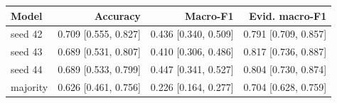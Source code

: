 \begin{tabular}{lrrr}
\toprule
Model & Accuracy & Macro-F1 & Evid. macro-F1 \\
\midrule
seed 42 & 0.709 [0.555, 0.827] & 0.436 [0.340, 0.509] & 0.791 [0.709, 0.857] \\
seed 43 & 0.689 [0.531, 0.807] & 0.410 [0.306, 0.486] & 0.817 [0.736, 0.887] \\
seed 44 & 0.689 [0.533, 0.799] & 0.447 [0.341, 0.527] & 0.804 [0.730, 0.874] \\
majority & 0.626 [0.461, 0.756] & 0.226 [0.164, 0.277] & 0.704 [0.628, 0.759] \\
\bottomrule
\end{tabular}
